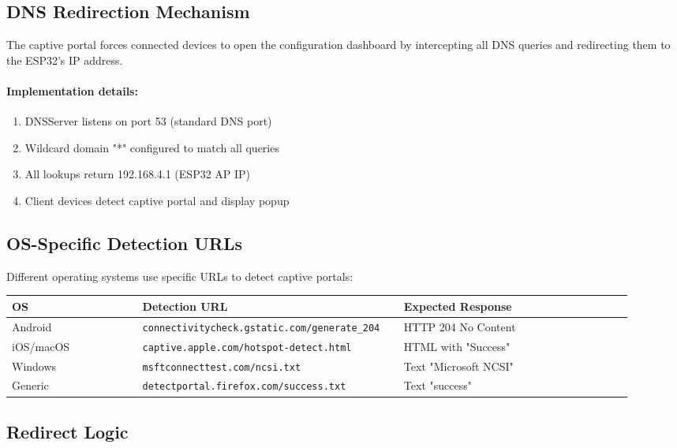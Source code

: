 \documentclass[11pt,a4paper]{article}
\begin{document}
\subsection{DNS Redirection Mechanism}

The captive portal forces connected devices to open the configuration dashboard by intercepting all DNS queries and redirecting them to the ESP32's IP address.

\paragraph{Implementation details:}
\begin{enumerate}[leftmargin=*]
  \item DNSServer listens on port 53 (standard DNS port)
  \item Wildcard domain "*" configured to match all queries
  \item All lookups return 192.168.4.1 (ESP32 AP IP)
  \item Client devices detect captive portal and display popup
\end{enumerate}

\subsection{OS-Specific Detection URLs}

Different operating systems use specific URLs to detect captive portals:

\begin{longtable}{>{\raggedright\arraybackslash}p{0.2\linewidth} p{0.4\linewidth} p{0.35\linewidth}}
\hline
\textbf{OS} & \textbf{Detection URL} & \textbf{Expected Response} \\
\hline
\endhead
Android & \texttt{connectivitycheck.gstatic.com/generate\_204} & HTTP 204 No Content \\
iOS/macOS & \texttt{captive.apple.com/hotspot-detect.html} & HTML with "Success" \\
Windows & \texttt{msftconnecttest.com/ncsi.txt} & Text "Microsoft NCSI" \\
Generic & \texttt{detectportal.firefox.com/success.txt} & Text "success" \\
\hline
\end{longtable}

\subsection{Redirect Logic}
\end{document}
